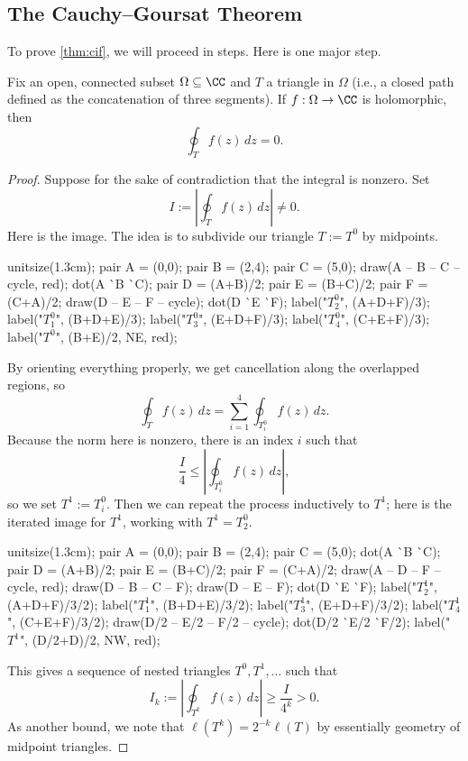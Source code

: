 \subsection{The Cauchy--Goursat Theorem}
To prove \autoref{thm:cif}, we will proceed in steps. Here is one major step.
\begin{theorem} \label{thm:cg}
	Fix an open, connected subset $\Omega\subseteq\CC$ and $T$ a triangle in $\Omega$ (i.e., a closed path defined as the concatenation of three segments). If $f:\Omega\to\CC$ is holomorphic, then
	\[\oint_Tf(z)\,dz=0.\]
\end{theorem}
\begin{proof}
	Suppose for the sake of contradiction that the integral is nonzero. Set
	\[I:=\left|\oint_Tf(z)\,dz\right|\ne0.\]
	Here is the image. The idea is to subdivide our triangle $T:=T^0$ by midpoints.
	\begin{center}
		\begin{asy}
			unitsize(1.3cm);
			pair A = (0,0);
			pair B = (2,4);
			pair C = (5,0);
			draw(A -- B -- C -- cycle, red);
			dot(A ^^ B ^^ C);
			pair D = (A+B)/2;
			pair E = (B+C)/2;
			pair F = (C+A)/2;
			draw(D -- E -- F -- cycle);
			dot(D ^^ E ^^ F);
			label("$T_2^0$", (A+D+F)/3);
			label("$T_1^0$", (B+D+E)/3);
			label("$T_3^0$", (E+D+F)/3);
			label("$T_4^0$", (C+E+F)/3);
			label("$T^0$", (B+E)/2, NE, red);
		\end{asy}
	\end{center}
	By orienting everything properly, we get cancellation along the overlapped regions, so
	\[\oint_Tf(z)\,dz=\sum_{i=1}^4\oint_{T^0_i}f(z)\,dz.\]
	Because the norm here is nonzero, there is an index $i$ such that
	\[\frac I4\le\left|\oint_{T^0_i}f(z)\,dz\right|,\]
	so we set $T^1:=T^0_i$. Then we can repeat the process inductively to $T^1$; here is the iterated image for $T^1$, working with $T^1=T^0_2$.
	\begin{center}
		\begin{asy}
			unitsize(1.3cm);
			pair A = (0,0);
			pair B = (2,4);
			pair C = (5,0);
			dot(A ^^ B ^^ C);
			pair D = (A+B)/2;
			pair E = (B+C)/2;
			pair F = (C+A)/2;
			draw(A -- D -- F -- cycle, red);
			draw(D -- B -- C -- F);
			draw(D -- E -- F);
			dot(D ^^ E ^^ F);
			label("$T_2^1$", (A+D+F)/3/2);
			label("$T_1^1$", (B+D+E)/3/2);
			label("$T_3^1$", (E+D+F)/3/2);
			label("$T_4^1$", (C+E+F)/3/2);
			draw(D/2 -- E/2 -- F/2 -- cycle);
			dot(D/2 ^^ E/2 ^^ F/2);
			label("$T^1$", (D/2+D)/2, NW, red);
		\end{asy}
	\end{center}
	This gives a sequence of nested triangles $T^0,T^1,\ldots$ such that
	\[I_k:=\left|\oint_{T^k}f(z)\,dz\right|\ge\frac I{4^k}>0.\]
	As another bound, we note that $\ell\left(T^k\right)=2^{-k}\ell(T)$ by essentially geometry of midpoint triangles.


\end{proof}
